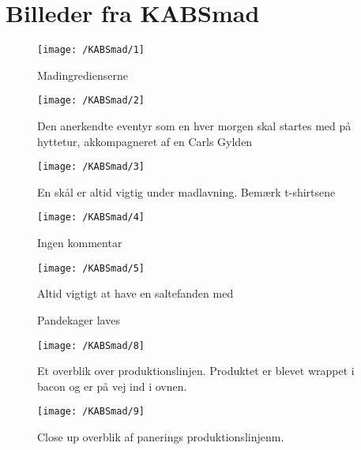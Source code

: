 \section{Billeder fra KABSmad} \label{app:kabsmad}

\begin{figure}[h!]
\centering
\texttt{[image: /KABSmad/1]}
\caption{Madingredienserne}
\end{figure}

\begin{figure}[h!]
\centering
\texttt{[image: /KABSmad/2]}
\caption{Den anerkendte eventyr som en hver morgen skal startes med på hyttetur, akkompagneret af en Carls Gylden }
\end{figure}

\begin{figure}[h!]
\centering
\texttt{[image: /KABSmad/3]}
\caption{En skål er altid vigtig under madlavning. Bemærk \HM t-shirtsene }
\end{figure}

\begin{figure}[h!]
\centering
\texttt{[image: /KABSmad/4]}
\caption{Ingen kommentar}
\end{figure}

\begin{figure}[h!]
\centering
\texttt{[image: /KABSmad/5]}
\caption{Altid vigtigt at have en saltefanden \cite{bib:url:Saltefanden} med}
\end{figure}

\begin{figure}[h!]
\centering
{}
\caption{Pandekager laves}
\label{fig:app1}
\end{figure}

\begin{figure}[h!]
\centering
\texttt{[image: /KABSmad/8]}
\caption{Et overblik over produktionslinjen. Produktet er blevet wrappet i bacon og er på vej ind i ovnen.}
\end{figure}

\begin{figure}[h!]
\centering
\texttt{[image: /KABSmad/9]}
\caption{Close up overblik af panerings produktionslinjenm.}
\end{figure}


